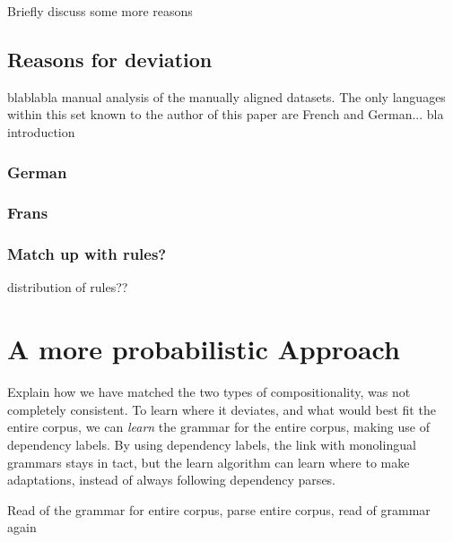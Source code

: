 \documentclass[hidelinks]{report}
\begin{document}
Briefly discuss some more reasons

\subsection{Reasons for deviation}

blablabla manual analysis of the manually aligned datasets. The only languages within this set known to the author of this paper are French and German... bla introduction

\subsubsection{German}

\subsubsection{Frans}

\subsubsection{Match up with rules?}

distribution of rules??

\section{A more probabilistic Approach}

Explain how we have matched the two types of compositionality, was not completely consistent. To learn where it deviates, and what would best fit the entire corpus, we can \textit{learn} the grammar for the entire corpus, making use of dependency labels. By using dependency labels, the link with monolingual grammars stays in tact, but the learn algorithm can learn where to make adaptations, instead of always following dependency parses.

Read of the grammar for entire corpus, parse entire corpus, read of grammar again


\section{}









\end{document}
